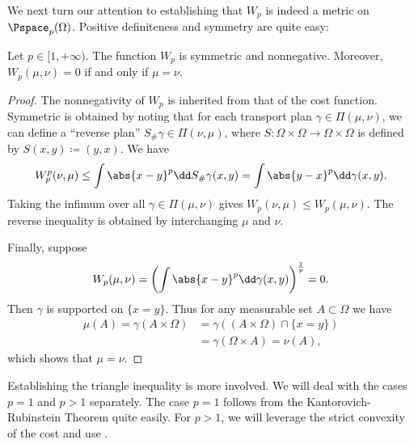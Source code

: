 \documentclass[oneside,reqno,letterpaper]{amsart}
\begin{document}
We next turn our attention to establishing that \(W_p\) is indeed a metric on \(\Pspace_p(\Omega)\).
Positive definiteness and symmetry are quite easy:
\begin{proposition}
  Let \(p \in [1, +\infty)\).
  The function \(W_p\) is symmetric and nonnegative.
  Moreover, \(W_p(\mu, \nu) = 0\) if and only if \(\mu = \nu\).
\end{proposition}
\begin{proof}
  The nonnegativity of \(W_p\) is inherited from that of the cost function.
  Symmetric is obtained by noting that for each transport plan \(\gamma \in \Pi(\mu, \nu)\), we can define a ``reverse plan'' \(S_{\#} \gamma \in \Pi(\nu, \mu)\), where \(S: \Omega \times \Omega \to \Omega \times \Omega\) is defined by \(S(x, y) \coloneqq (y, x)\).
  We have
  \[
    W_p^p(\nu, \mu)
    \leq \int \abs{x - y}^p \dd S_{\#} \gamma(x, y)
    = \int \abs{y - x}^p \dd \gamma(x, y).
  \]
  Taking the infimum over all \(\gamma \in \Pi(\mu, \nu)\) gives \(W_p(\nu, \mu) \leq W_p(\mu, \nu)\).
  The reverse inequality is obtained by interchanging \(\mu\) and \(\nu\).

  Finally, suppose
  \[
    W_p(\mu, \nu)
    = \left( \int \abs{x - y}^p \dd \gamma(x, y) \right)^{\frac{1}{p}}
    = 0.
  \]
  Then \(\gamma\) is supported on \(\{x = y\}\).
  Thus for any measurable set \(A \subset \Omega\) we have
  \begin{align*}
    \mu(A)
    = \gamma(A \times \Omega)
    &= \gamma\left( (A \times \Omega) \cap \{x = y\} \right) \\
    &= \gamma(\Omega \times A)
    = \nu(A),
  \end{align*}
  which shows that \(\mu = \nu\).
\end{proof}


Establishing the triangle inequality is more involved.
We will deal with the cases \(p = 1\) and \(p > 1\) separately.
The case \(p = 1\) follows from the Kantorovich-Rubinstein Theorem quite easily.
For \(p > 1\), we will leverage the strict convexity of the cost and use .
\end{document}
